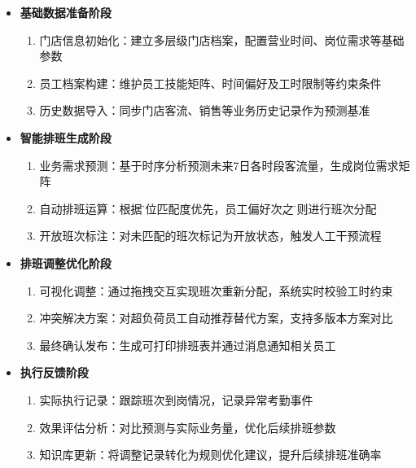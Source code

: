 \documentclass{ctexart}
\begin{document}
\begin{itemize}
    \item \textbf{基础数据准备阶段}
    \begin{enumerate}
        \item 门店信息初始化：建立多层级门店档案，配置营业时间、岗位需求等基础参数
        \item 员工档案构建：维护员工技能矩阵、时间偏好及工时限制等约束条件
        \item 历史数据导入：同步门店客流、销售等业务历史记录作为预测基准
    \end{enumerate}

    \item \textbf{智能排班生成阶段}
    \begin{enumerate}
        \item 业务需求预测：基于时序分析预测未来7日各时段客流量，生成岗位需求矩阵
        \item 自动排班运算：根据\"岗位匹配度优先，员工偏好次之\"原则进行班次分配
        \item 开放班次标注：对未匹配的班次标记为开放状态，触发人工干预流程
    \end{enumerate}

    \item \textbf{排班调整优化阶段}
    \begin{enumerate}
        \item 可视化调整：通过拖拽交互实现班次重新分配，系统实时校验工时约束
        \item 冲突解决方案：对超负荷员工自动推荐替代方案，支持多版本方案对比
        \item 最终确认发布：生成可打印排班表并通过消息通知相关员工
    \end{enumerate}

    \item \textbf{执行反馈阶段}
    \begin{enumerate}
        \item 实际执行记录：跟踪班次到岗情况，记录异常考勤事件
        \item 效果评估分析：对比预测与实际业务量，优化后续排班参数
        \item 知识库更新：将调整记录转化为规则优化建议，提升后续排班准确率
    \end{enumerate}
\end{itemize}
\end{document}
